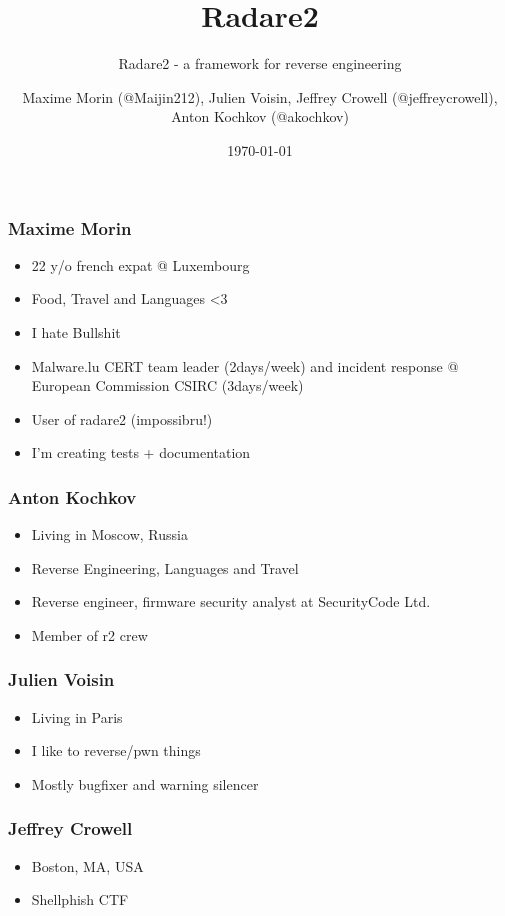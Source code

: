 \documentclass[10pt,pdf,utf8,english,compress,hyperref={unicode}]{beamer}
\title{Radare2}
\subtitle{Radare2 - a framework for reverse engineering}
\author{Maxime Morin (@Maijin212), Julien Voisin, Jeffrey Crowell (@jeffreycrowell), Anton Kochkov (@akochkov)}
\date{\today}
\institute{Hack.lu 10-2015}
\begin{document}
\maketitle

\begin{frame}[fragile]
  \frametitle{Maxime Morin}
    \begin{itemize}
    \item 22 y/o french expat @ Luxembourg
    \item Food, Travel and Languages \textless3
    \item I hate Bullshit
    \item Malware.lu CERT team leader (2days/week) and incident response @ European Commission CSIRC (3days/week)
    \item User of radare2 (impossibru!)
    \item I'm creating tests + documentation
    \end{itemize}
\end{frame}

\begin{frame}[fragile]
  \frametitle{Anton Kochkov}
    \begin{itemize}
    \item Living in Moscow, Russia
    \item Reverse Engineering, Languages and Travel
    \item Reverse engineer, firmware security analyst at SecurityCode Ltd.
    \item Member of r2 crew
    \end{itemize}
\end{frame}

\begin{frame}[fragile]
  \frametitle{Julien Voisin}
    \begin{itemize}
    \item Living in Paris
    \item I like to reverse/pwn things
    \item Mostly bugfixer and warning silencer
    \end{itemize}
\end{frame}

\begin{frame}[fragile]
  \frametitle{Jeffrey Crowell}
    \begin{itemize}
			\item Boston, MA, USA
			\item Shellphish CTF
    \end{itemize}
\end{frame}
\end{document}
